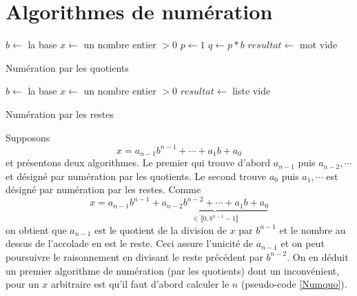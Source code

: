 \section{Algorithmes de numération}
\begin{algorithm}
 $b \leftarrow $ la base \;
 $x \leftarrow $ un nombre entier $>0$\; 
 $p \leftarrow 1$\;
 $q \leftarrow p*b$\;
 $resultat \leftarrow$ mot vide \;
 \;
 \caption{Numération par les quotients}
 \label{Numquo}
\end{algorithm}
\begin{algorithm}[h!]
 $b \leftarrow $ la base \;
 $x \leftarrow $ un nombre entier $>0$ \;
 $resultat \leftarrow$ liste vide \;
 \caption{Numération par les restes}
 \label{Numrem} 
\end{algorithm}

Supposons
\begin{displaymath}
 x = a_{n-1}b^{n-1} + \cdots +  a_1 b + a_0
\end{displaymath}
et présentons deux algorithmes. Le premier qui trouve d'abord $a_{n-1}$ puis $a_{n-2}, \cdots$ et désigné par \og numération par les quotients\fg. Le second trouve $a_0$ puis $a_1, \cdots$ est désigné par \og numération par les restes\fg.\newline
Comme 
\begin{displaymath}
 x = a_{n-1}b^{n-1} + \underset{\in \llbracket 0 ,b^{n-1}-1\rrbracket}{\underbrace{a_{n-2}b^{n-2}  + \cdots + a_1 b + a_0}}
\end{displaymath}
on obtient que $a_{n-1}$ est le quotient de la division de $x$ par $b^{n-1}$ et le nombre au dessus de l'accolade en est le reste. Ceci assure l'unicité de $a_{n-1}$ et on peut poursuivre le raisonnement en divisant le reste précédent par $b^{n-2}$. On en déduit un premier algorithme de numération (\og par les quotients\fg) dont un inconvénient, pour un $x$ arbitraire est qu'il faut d'abord calculer le $n$ (pseudo-code \ref{Numquo}).

